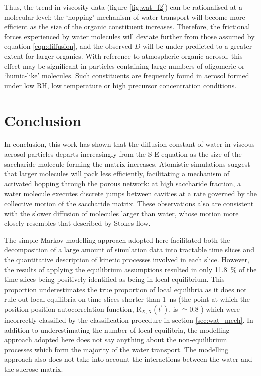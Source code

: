 Thus, the trend in viscosity data (figure \ref{fig:wat_f2}) can be rationalised at a molecular level: the `hopping’ mechanism of water transport will become more efficient as the size of the organic constituent increases. Therefore, the frictional forces experienced by water molecules will deviate further from those assumed by equation \ref{eqn:diffusion}, and the observed $D$ will be under-predicted to a greater extent for larger organics. With reference to atmospheric organic aerosol, this effect may be significant in particles containing large numbers of oligomeric or `humic-like’ molecules. Such constituents are frequently found in aerosol formed under low RH,\cite{Jia2018} low temperature\cite{huang2018alpha} or high precursor concentration\cite{Kourtchev2016} conditions.

\section{Conclusion}\label{sec:wat_conclusions}
In conclusion, this work has shown that the diffusion constant of water in viscous aerosol particles departs increasingly from the S-E equation as the size of the saccharide molecule forming the matrix increases. Atomistic simulations suggest that larger molecules will pack less efficiently, facilitating a mechanism of activated hopping through the porous network: at high saccharide fraction, a water molecule executes discrete jumps between cavities at a rate governed by the collective motion of the saccharide matrix. These observations also are consistent with the slower diffusion of molecules larger than water, whose motion more closely resembles that described by Stokes flow\cite{Gonzalez2015}.

The simple Markov modelling approach adopted here facilitated both the decomposition of a large amount of simulation data into tractable time slices and the quantitative description of kinetic processes involved in each slice. However, the results of applying the equilibrium assumptions resulted in only \SI{11.8}{\percent} of the time slices being  positively identified as being in local equilibrium. This proportion underestimates the true proportion of local equilibria as it does not rule out local equilibria on time slices shorter than \SI{1}{\nano\second} (the point at which the position-position autocorrelation function, $\mathrm{R}_{X,  X}(t^{\prime})$, is $\simeq 0.8$ ) which were incorrectly classified by the classification procedure in section \ref{sec:wat_mech}.  In addition to underestimating the number of local equilibria, the modelling approach adopted here does not say anything about the non-equilibrium processes which form the majority of the water transport. The modelling approach also does not take into account the interactions between the water and the sucrose matrix. 



